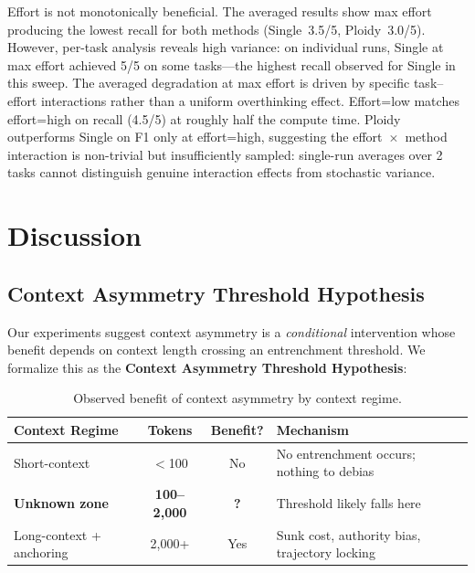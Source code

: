 \documentclass[11pt]{article}
\begin{document}
Effort is not monotonically beneficial. The averaged results show max effort producing the lowest recall for both methods (Single~3.5/5, Ploidy~3.0/5). However, per-task analysis reveals high variance: on individual runs, Single at max effort achieved 5/5 on some tasks---the highest recall observed for Single in this sweep. The averaged degradation at max effort is driven by specific task--effort interactions rather than a uniform overthinking effect. Effort=low matches effort=high on recall (4.5/5) at roughly half the compute time. Ploidy outperforms Single on F1 only at effort=high, suggesting the effort~$\times$~method interaction is non-trivial but insufficiently sampled: single-run averages over 2 tasks cannot distinguish genuine interaction effects from stochastic variance.

\section{Discussion}
\label{sec:discussion}

\subsection{Context Asymmetry Threshold Hypothesis}
\label{sec:threshold}

Our experiments suggest context asymmetry is a \emph{conditional} intervention whose benefit depends on context length crossing an entrenchment threshold. We formalize this as the \textbf{Context Asymmetry Threshold Hypothesis}:

\begin{table}[H]
\centering
\caption{Observed benefit of context asymmetry by context regime.}
\label{tab:threshold}
\small
\begin{tabular}{@{}lccl@{}}
\toprule
\textbf{Context Regime} & \textbf{Tokens} & \textbf{Benefit?} & \textbf{Mechanism} \\
\midrule
Short-context & $<$100 & No & No entrenchment occurs; nothing to debias \\
\textbf{Unknown zone} & \textbf{100--2,000} & \textbf{?} & Threshold likely falls here \\
Long-context + anchoring & 2,000+ & Yes & Sunk cost, authority bias, trajectory locking \\
\bottomrule
\end{tabular}
\end{table}
\end{document}
